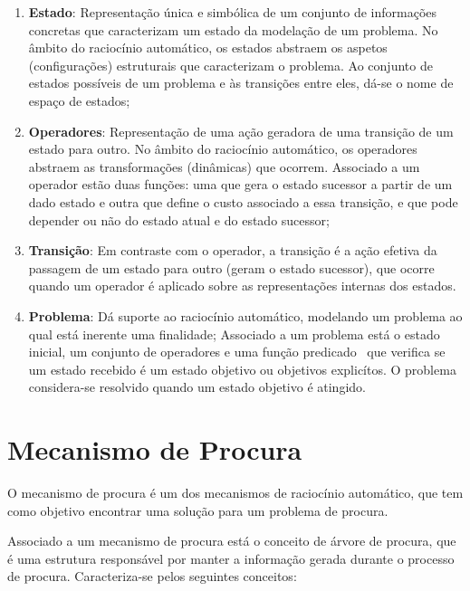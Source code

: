 \begin{enumerate}
    \item \textbf{Estado}: Representação única e simbólica de um conjunto de informações concretas que caracterizam um estado da modelação de um problema. No âmbito do raciocínio automático, os estados abstraem os aspetos (configurações) estruturais que caracterizam o problema. Ao conjunto de estados possíveis de um problema e às transições entre eles, dá-se o nome de espaço de estados;
    \item \textbf{Operadores}: Representação de uma ação geradora de uma transição de um estado para outro.
    No âmbito do raciocínio automático, os operadores abstraem as transformações (dinâmicas) que ocorrem.
    Associado a um operador estão duas funções: uma que gera o estado sucessor a partir de um dado estado e outra que define o custo associado a essa transição, e que pode depender ou não do estado atual e do estado sucessor;
    \item \textbf{Transição}: Em contraste com o operador, a transição é a ação efetiva da passagem de um estado para outro (geram o estado sucessor), que ocorre quando um operador é aplicado sobre as representações internas dos estados.
    \item \textbf{Problema}: Dá suporte ao raciocínio automático, modelando um problema ao qual está inerente uma finalidade;
    Associado a um problema está o estado inicial, um conjunto de operadores e uma função predicado~\cite{stanford:fp:function-predicates} que verifica se um estado recebido é um estado objetivo ou objetivos explicítos.
    O problema considera-se resolvido quando um estado objetivo é atingido.
\end{enumerate}


\section{Mecanismo de Procura}\label{sec:mecanismo-procura}

O mecanismo de procura é um dos mecanismos de raciocínio automático, que tem como objetivo encontrar uma solução para um problema de procura.

Associado a um mecanismo de procura está o conceito de árvore de procura, que é uma estrutura responsável por manter a informação gerada durante o processo de procura.
Caracteriza-se pelos seguintes conceitos:

